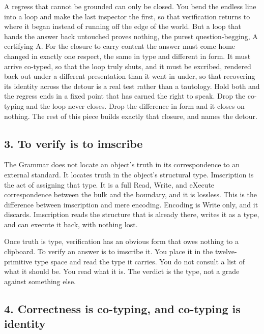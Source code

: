 \documentclass[12pt,a4paper]{article}
\begin{document}
A regress that cannot be grounded can only be closed. You bend the
endless line into a loop and make the last inspector the first, so that
verification returns to where it began instead of running off the edge
of the world. But a loop that hands the answer back untouched proves
nothing, the purest question-begging, A certifying A. For the closure to
carry content the answer must come home changed in exactly one respect,
the same in type and different in form. It must arrive co-typed, so that
the loop truly shuts, and it must be excribed, rendered back out under a
different presentation than it went in under, so that recovering its
identity across the detour is a real test rather than a tautology. Hold
both and the regress ends in a fixed point that has earned the right to
speak. Drop the co-typing and the loop never closes. Drop the difference
in form and it closes on nothing. The rest of this piece builds exactly
that closure, and names the detour.

\hypertarget{to-verify-is-to-imscribe-1}{%
\subsection{3. To verify is to
imscribe}\label{to-verify-is-to-imscribe-1}}

The Grammar does not locate an object's truth in its correspondence to
an external standard. It locates truth in the object's structural type.
Imscription is the act of assigning that type. It is a full Read, Write,
and eXecute correspondence between the bulk and the boundary, and it is
lossless. This is the difference between imscription and mere encoding.
Encoding is Write only, and it discards. Imscription reads the structure
that is already there, writes it as a type, and can execute it back,
with nothing lost.

Once truth is type, verification has an obvious form that owes nothing
to a clipboard. To verify an answer is to imscribe it. You place it in
the twelve-primitive type space and read the type it carries. You do not
consult a list of what it should be. You read what it is. The verdict is
the type, not a grade against something else.

\hypertarget{correctness-is-co-typing-and-co-typing-is-identity}{%
\subsection{4. Correctness is co-typing, and co-typing is
identity}\label{correctness-is-co-typing-and-co-typing-is-identity}}
\end{document}
